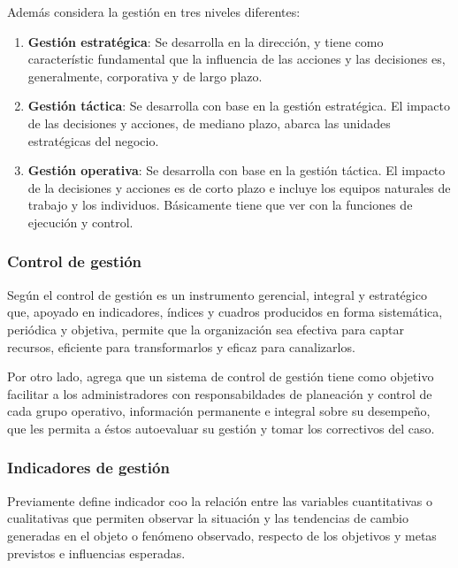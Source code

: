 Adem\'as \cite{beltran} considera la gesti\'on en tres niveles diferentes:
\begin{enumerate}
    \item \textbf{Gesti\'on estrat\'egica}: Se desarrolla en la direcci\'on, y tiene como
          caracter\'istic fundamental que la influencia de las acciones y las decisiones
          es, generalmente, corporativa y de largo plazo.
    \item \textbf{Gesti\'on t\'actica}: Se desarrolla con base en la gesti\'on
          estrat\'egica. El impacto de las decisiones y acciones, de mediano plazo,
          abarca las unidades estrat\'egicas del negocio.
    \item \textbf{Gesti\'on operativa}: Se desarrolla con base en la gesti\'on
          t\'actica. El impacto de la decisiones y acciones es de corto plazo e incluye
          los equipos naturales de trabajo y los individuos. B\'asicamente tiene
          que ver con la funciones de ejecuci\'on y control.
\end{enumerate}

\subsubsection{Control de gesti\'on}
Seg\'un \cite{beltran} el control de gesti\'on es un instrumento gerencial, integral
y estrat\'egico que, apoyado en indicadores, \'indices y cuadros producidos en forma
sistem\'atica, peri\'odica y objetiva, permite que la organizaci\'on sea efectiva para
captar recursos, eficiente para transformarlos y eficaz para canalizarlos.

Por otro lado, \cite{beltran} agrega que un sistema de control de gesti\'on tiene
como objetivo facilitar a los administradores con responsabildades de planeaci\'on
y control de cada grupo operativo, informaci\'on permanente e integral sobre su desempe\~no,
que les permita a \'estos autoevaluar su gesti\'on y tomar los correctivos del caso.

\subsubsection{Indicadores de gesti\'on}
Previamente \cite{beltran} define indicador coo la relaci\'on entre las variables
cuantitativas o cualitativas que permiten observar la situaci\'on y las tendencias
de cambio generadas en el objeto o fen\'omeno observado, respecto de los objetivos
y metas previstos e influencias esperadas.

